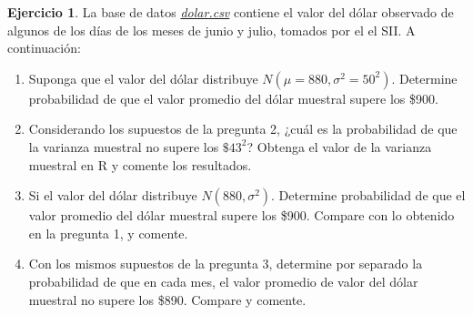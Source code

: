 \documentclass[
  11pt,
]{book}
\providecommand{\tightlist}{%
  \setlength{\itemsep}{0pt}\setlength{\parskip}{0pt}}
\theoremstyle{definition}
\theoremstyle{definition}
\theoremstyle{definition}
\newtheorem{exercise}{Ejercicio}[chapter]
\theoremstyle{definition}
\theoremstyle{remark}
\begin{document}
\begin{exercise}

La base de datos \href{https://raw.githubusercontent.com/Dfranzani/Bases-de-datos-para-cursos/main/2022-2/Estad\%C3\%ADstica\%201/dolar.csv}{\emph{dolar.csv}} contiene el valor del dólar observado de algunos de los días de los meses de junio y julio, tomados por el el SII. A continuación:

\begin{enumerate}
\def\labelenumi{\arabic{enumi}.}
\tightlist
\item
  Suponga que el valor del dólar distribuye \(N(\mu = 880,\sigma^2 = 50^2)\). Determine probabilidad de que el valor promedio del dólar muestral supere los \$900.
\item
  Considerando los supuestos de la pregunta 2, ¿cuál es la probabilidad de que la varianza muestral no supere los \(\$43^2\)? Obtenga el valor de la varianza muestral en R y comente los resultados.
\item
  Si el valor del dólar distribuye \(N(880,\sigma^2)\). Determine probabilidad de que el valor promedio del dólar muestral supere los \$900. Compare con lo obtenido en la pregunta 1, y comente.
\item
  Con los mismos supuestos de la pregunta 3, determine por separado la probabilidad de que en cada mes, el valor promedio de valor del dólar muestral no supere los \$890. Compare y comente.
\end{enumerate}

\end{exercise}
\end{document}
